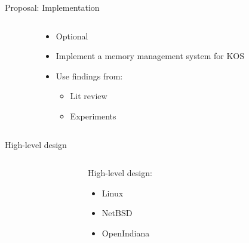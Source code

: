\documentclass[aspectratio=169]{beamer}
\newcommand{\bi}{\begin{itemize}}
\newcommand{\ei}{\end{itemize}}
\begin{document}
\begin{frame}{Proposal: Implementation}
  \begin{columns}[T]
    \begin{column}{0.2\textwidth}
    \end{column}
    \begin{column}{0.6\textwidth}
      \bi
      \pause
    \item Optional
      \pause
    \item Implement a memory management system for KOS
      \pause
    \item Use findings from:
      \bi
      \pause
    \item Lit review
      \pause
    \item Experiments
      \ei
      \ei
    \end{column}
    \begin{column}{0.2\textwidth}
    \end{column}
  \end{columns}
\end{frame}

\begin{frame}{High-level design}
  \begin{columns}[T]
    \begin{column}{0.2\textwidth}
    \end{column}
    \begin{column}{0.6\textwidth}
      High-level design:
      \bi
    \item Linux
    \item NetBSD
    \item OpenIndiana
      \ei
    \end{column}
    \begin{column}{0.2\textwidth}
    \end{column}
  \end{columns}
\end{frame}
\end{document}
